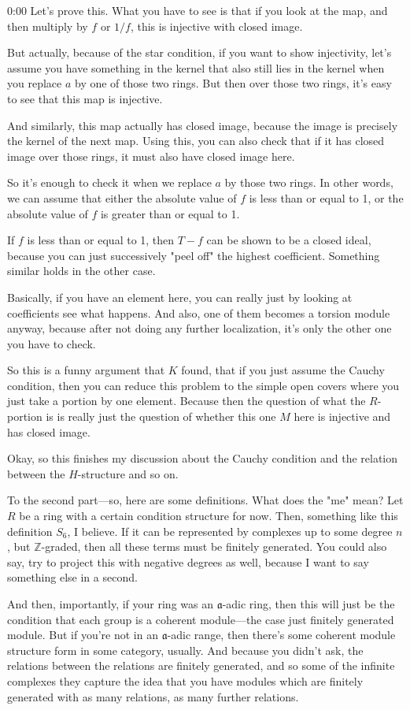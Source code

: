 \begin{unfinished}{0:00}
Let's prove this. What you have to see is that if you look at the map, and then multiply by $f$ or $1/f$, this is injective with closed image.

But actually, because of the star condition, if you want to show injectivity, let's assume you have something in the kernel that also still lies in the kernel when you replace $a$ by one of those two rings. But then over those two rings, it's easy to see that this map is injective.

And similarly, this map actually has closed image, because the image is precisely the kernel of the next map. Using this, you can also check that if it has closed image over those rings, it must also have closed image here.

So it's enough to check it when we replace $a$ by those two rings. In other words, we can assume that either the absolute value of $f$ is less than or equal to 1, or the absolute value of $f$ is greater than or equal to 1.

If $f$ is less than or equal to 1, then $T - f$ can be shown to be a closed ideal, because you can just successively "peel off" the highest coefficient. Something similar holds in the other case.

Basically, if you have an element here, you can really just by looking at coefficients see what happens. And also, one of them becomes a torsion module anyway, because after not doing any further localization, it's only the other one you have to check.

So this is a funny argument that $K$ found, that if you just assume the Cauchy condition, then you can reduce this problem to the simple open covers where you just take a portion by one element. Because then the question of what the $R$-portion is is really just the question of whether this one $M$ here is injective and has closed image.

Okay, so this finishes my discussion about the Cauchy condition and the relation between the $H$-structure and so on.

To the second part---so, here are some definitions. What does the "me" mean? Let $R$ be a ring with a certain condition structure for now. Then, something like this definition $S_6$, I believe. If it can be represented by complexes up to some degree $n$, but $\mathbb{Z}$-graded, then all these terms must be finitely generated. You could also say, try to project this with negative degrees as well, because I want to say something else in a second.

And then, importantly, if your ring was an $\mathfrak{a}$-adic ring, then this will just be the condition that each group is a coherent module---the case just finitely generated module. But if you're not in an $\mathfrak{a}$-adic range, then there's some coherent module structure form in some category, usually. And because you didn't ask, the relations between the relations are finitely generated, and so some of the infinite complexes they capture the idea that you have modules which are finitely generated with as many relations, as many further relations.


\end{unfinished}

